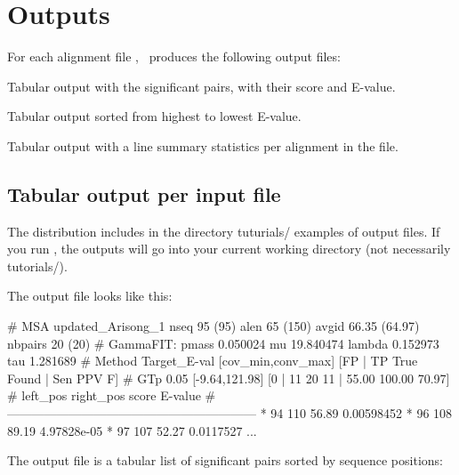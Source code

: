 \label{section:outputs}
\setcounter{footnote}{0}
\section{Outputs}

For each alignment file , \rscape\, produces the
following output files:

\begin{sreitems}{}
\item[\emprog{rnafile.out}] Tabular output with the significant pairs,
  with their score and E-value.
%
\item[\emprog{rnafile.sorted.out}] Tabular output sorted from highest to
  lowest E-value.
%
%
\item[\emprog{rnafile.sum}] Tabular output with a line summary statistics
  per alignment in the file.
%
\end{sreitems}

\subsection{Tabular output per input file}

The distribution includes in the directory tuturials/ examples of
output files. If you run \rscape, the outputs will go into your
current working directory (not necessarily tutorials/).

The output file  looks like this:

\begin{sreoutput}
# MSA updated_Arisong_1 nseq 95 (95) alen 65 (150) avgid 66.35 (64.97) nbpairs 20 (20)
# GammaFIT: pmass 0.050024 mu 19.840474 lambda 0.152973 tau 1.281689
# Method Target_E-val [cov_min,conv_max] [FP | TP True Found | Sen PPV F] 
# GTp    0.05           [-9.64,121.98]    [0 | 11 20 11 | 55.00 100.00 70.97] 
#       left_pos       right_pos        score   E-value
#------------------------------------------------------------
*               94             110      56.89   0.00598452
*               96             108      89.19   4.97828e-05
*               97             107      52.27   0.0117527
...
\end{sreoutput}
The output file is a tabular list of significant pairs sorted by sequence positions:

